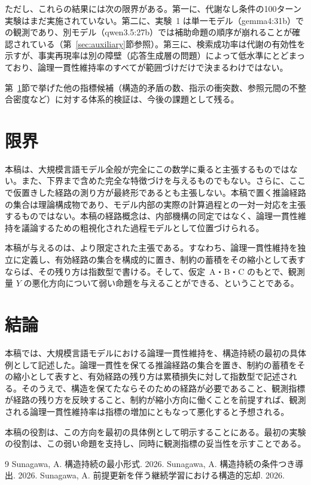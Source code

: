 \documentclass[12pt,a4paper]{article}
\begin{document}
ただし、これらの結果には次の限界がある。第一に、代謝なし条件の100ターン実験はまだ実施されていない。第二に、実験~1 は単一モデル（gemma4:31b）での観測であり、別モデル（qwen3.5:27b）では補助命題の順序が崩れることが確認されている（第~\ref{sec:auxiliary}節参照）。第三に、検索成功率は代謝の有効性を示すが、事実再現率は別の障壁（応答生成層の問題）によって低水準にとどまっており、論理一貫性維持率のすべてが範囲づけだけで決まるわけではない。

第~\ref{sec:constraints}節で挙げた他の指標候補（構造的矛盾の数、指示の衝突数、参照元間の不整合密度など）に対する体系的検証は、今後の課題として残る。

\section{限界}\label{sec:constraints}

本稿は、大規模言語モデル全般が完全にこの数学に乗ると主張するものではない。また、下界まで含めた完全な特徴づけを与えるものでもない。さらに、ここで仮置きした経路の測り方が最終形であるとも主張しない。本稿で置く推論経路の集合は理論構成物であり、モデル内部の実際の計算過程との一対一対応を主張するものではない。本稿の経路概念は、内部機構の同定ではなく、論理一貫性維持を議論するための粗視化された過程モデルとして位置づけられる。

本稿が与えるのは、より限定された主張である。すなわち、論理一貫性維持を独立に定義し、有効経路の集合を構成的に置き、制約の蓄積をその縮小として表すならば、その残り方は指数型で書ける。そして、仮定~A・B・C のもとで、観測量 $Y$ の悪化方向について弱い命題を与えることができる、ということである。

\section{結論}

本稿では、大規模言語モデルにおける論理一貫性維持を、構造持続の最初の具体例として記述した。論理一貫性を保てる推論経路の集合を置き、制約の蓄積をその縮小として表すと、有効経路の残り方は累積損失に対して指数型で記述される。そのうえで、構造を保てたならそのための経路が必要であること、観測指標が経路の残り方を反映すること、制約が縮小方向に働くことを前提すれば、観測される論理一貫性維持率は指標の増加にともなって悪化すると予想される。

本稿の役割は、この方向を最初の具体例として明示することにある。最初の実験の役割は、この弱い命題を支持し、同時に観測指標の妥当性を示すことである。

\begin{thebibliography}{9}
 Sunagawa, A. 構造持続の最小形式. 2026.
 Sunagawa, A. 構造持続の条件つき導出. 2026.
 Sunagawa, A. 前提更新を伴う継続学習における構造的忘却. 2026.
\end{thebibliography}
\end{document}
